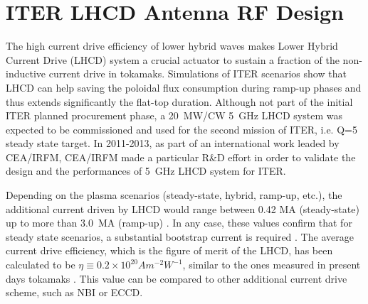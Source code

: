 %
%


\clearpage
\section[ITER Antenna RF Design]{ITER LHCD Antenna RF Design}\label{sec:ITER_LHCD_antenna}
The high current drive efficiency of lower hybrid waves makes Lower Hybrid Current Drive (LHCD) system a crucial actuator to sustain a fraction of the non-inductive current drive in tokamaks. Simulations of ITER scenarios show that LHCD can help saving the poloidal flux consumption during ramp-up phases and thus extends significantly the flat-top duration. Although not part of the initial ITER planned procurement phase, a 20~MW/CW 5~GHz LHCD system was expected to be commissioned and used for the second mission of ITER, i.e. Q=5 steady state target. In 2011-2013, as part of an international work leaded by CEA/IRFM, CEA/IRFM made a particular R\&D effort in order to validate the design and the performances of 5~\si{GHz} LHCD system for ITER. 

Depending on the plasma scenarios (steady-state, hybrid, ramp-up, etc.), the additional current driven by LHCD would range between 0.42 MA (steady-state) up to more than 3.0~MA (ramp-up) . In any case, these values confirm that for steady state scenarios, a substantial bootstrap current is required . The average current drive efficiency, which is the figure of merit of the LHCD, has been calculated to be $\eta \equiv 0.2 \times 10^{20} \si{A m^{-2} W^{-1}}$, similar to the ones measured in present days tokamaks . This value  can be compared to other additional current drive scheme, such as NBI or ECCD. 

